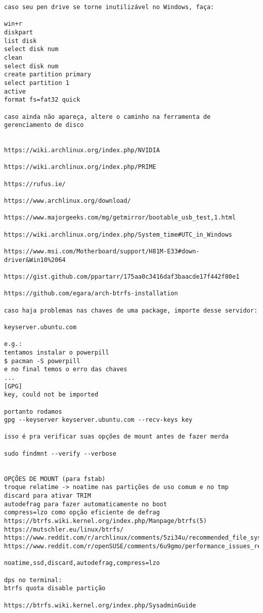 \documentclass[dark, index]{Iart}
\begin{document}
\begin{lstlisting}
caso seu pen drive se torne inutilizável no Windows, faça:

win+r
diskpart
list disk
select disk num
clean
select disk num
create partition primary
select partition 1
active
format fs=fat32 quick

caso ainda não apareça, altere o caminho na ferramenta de gerenciamento de disco


https://wiki.archlinux.org/index.php/NVIDIA

https://wiki.archlinux.org/index.php/PRIME

https://rufus.ie/

https://www.archlinux.org/download/

https://www.majorgeeks.com/mg/getmirror/bootable_usb_test,1.html

https://wiki.archlinux.org/index.php/System_time#UTC_in_Windows

https://www.msi.com/Motherboard/support/H81M-E33#down-driver&Win10%2064

https://gist.github.com/ppartarr/175aa0c3416daf3baacde17f442f80e1

https://github.com/egara/arch-btrfs-installation

caso haja problemas nas chaves de uma package, importe desse servidor:

keyserver.ubuntu.com

e.g.:
tentamos instalar o powerpill
$ pacman -S powerpill
e no final temos o erro das chaves
...
[GPG]
key, could not be imported

portanto rodamos
gpg --keyserver keyserver.ubuntu.com --recv-keys key

isso é pra verificar suas opções de mount antes de fazer merda

sudo findmnt --verify --verbose


OPÇÕES DE MOUNT (para fstab)
troque relatime -> noatime nas partições de uso comum e no tmp
discard para ativar TRIM
autodefrag para fazer automaticamente no boot
compress=lzo como opção eficiente de defrag
https://btrfs.wiki.kernel.org/index.php/Manpage/btrfs(5)
https://mutschler.eu/linux/btrfs/
https://www.reddit.com/r/archlinux/comments/5zi34u/recommended_file_system_for_a_nvme_ssd_and_your/
https://www.reddit.com/r/openSUSE/comments/6u9gmo/performance_issues_related_with_btrfs/

noatime,ssd,discard,autodefrag,compress=lzo

dps no terminal:
btrfs quota disable partição

https://btrfs.wiki.kernel.org/index.php/SysadminGuide



\end{lstlisting}
\end{document}
